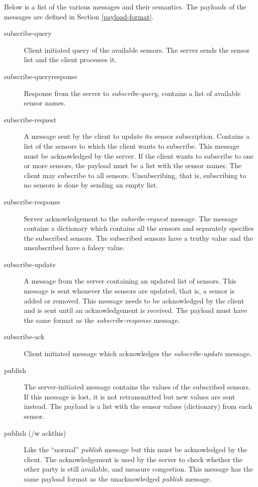 \documentclass[a4paper]{article}
\begin{document}
Below is a list of the various messages and their semantics. The payloads of the
messages are defined in Section \ref{payload-format}.
\begin{description}
	\item[subscribe-query] Client initiated query of the available 
	sensors. The server sends the sensor list and the client processes it.
    
	\item[subscribe-queryresponse] Response from the server to 
	\emph{subscribe-query}, contains a list of available sensor names. 
    
	\item[subscribe-request] A message sent by the client to update its sensor
	subscription. Contains a list of the sensors to which the client wants to
	subscribe. This message must be acknowledged by the server. If the client
    wants to subscribe to one or more sensors, the payload must be a list with
    the sensor names. The client may subscribe to all sensors. Unsubscribing,
    that is, subscribing to no sensors is done by sending an empty list.
    
	\item[subscribe-response] Server acknowledgement to the 
	\emph{subsribe-request} message. The message contains a dictionary which
    contains all the sensors and separately specifies the subscribed sensors.
    The subscribed sensors have a truthy value and the unsubscribed have a falsey
    value.

	\item[subscribe-update] A message from the server containing an updated
	list of sensors. This message is sent whenever the sensors are updated,
	that is, a sensor is added or removed. This message needs to be acknowledged 
	by the client and is sent until an acknowledgement is received. The payload
    must have the same format as the \emph{subscribe-response} message.
    
	\item[subscribe-ack] Client initiated message which acknowledges the 
	\emph{subscribe-update} message.
    
	\item[publish] The server-initiated message contains the values of
	the subscribed sensors. If this message is lost, it is not retransmitted but
	new values are sent instead. The payload is a list with the sensor values 
    (dictionary) from each sensor.
    
	\item[publish (/w ackthis)] Like the ``normal'' \emph{publish} message
	but this must be acknowledged by the client. The acknowledgement is used
	by the server to check whether the other party is still	available, and measure
    congestion. This message has the same payload format as the unacknowledged
    \emph{publish} message.
    

\end{description}
\end{document}
